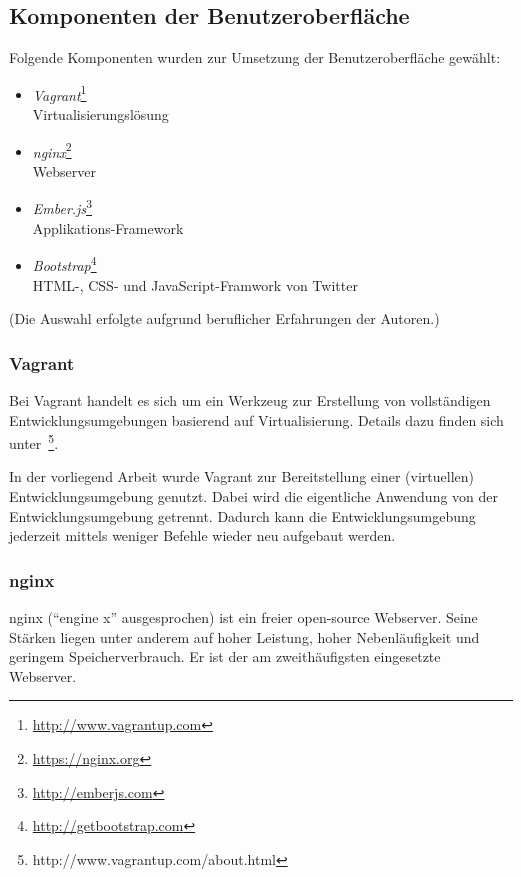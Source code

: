 \subsection{Komponenten der Benutzeroberfläche}
\label{subsec:komponenten:gui:komponenten}
Folgende Komponenten wurden zur Umsetzung der Benutzeroberfläche gewählt:
\begin{itemize}
    \item \textit{Vagrant}\footnote{\url{http://www.vagrantup.com}}\\
        Virtualisierungslösung
    \item \textit{nginx}\footnote{\url{https://nginx.org}}\\
        Webserver
    \item \textit{Ember.js}\footnote{\url{http://emberjs.com}}\\
        Applikations-Framework
    \item \textit{Bootstrap}\footnote{\url{http://getbootstrap.com}}\\
        HTML-, CSS- und JavaScript-Framwork von Twitter
\end{itemize}
(Die Auswahl erfolgte aufgrund beruflicher Erfahrungen der Autoren.)

\subsubsection{Vagrant}
\label{ssubsec:komponenten:gui:komponenten:vagrant}
Bei Vagrant handelt es sich um ein Werkzeug zur Erstellung von vollständigen Entwicklungsumgebungen basierend auf Virtualisierung. Details dazu finden sich unter~\footnote{http://www.vagrantup.com/about.html}.~\cite{vagrant}

In der vorliegend Arbeit wurde Vagrant zur Bereitstellung einer (virtuellen) Entwicklungsumgebung genutzt. Dabei wird die eigentliche Anwendung von der Entwicklungsumgebung getrennt. Dadurch kann die Entwicklungsumgebung jederzeit mittels weniger Befehle wieder neu aufgebaut werden.

\subsubsection{nginx}
\label{ssubsec:komponenten:gui:komponenten:nginx}
nginx (``engine x'' ausgesprochen) ist ein freier open-source Webserver. Seine Stärken liegen unter anderem  auf hoher Leistung, hoher Nebenläufigkeit und geringem Speicherverbrauch. Er ist der am zweithäufigsten eingesetzte Webserver.~\cite{nginx}

